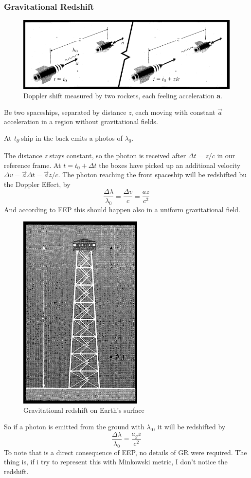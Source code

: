 \subsubsection{Gravitational Redshift}
\begin{figure}[h]
\centering
\includegraphics[width=0.8\linewidth]{imm/gravshift1.png}
\caption{Doppler shift measured by two rockets, each feeling acceleration \textbf{a}.}
\label{imm:gravshift1.png}
\end{figure}

Be two spaceships, separated by distance \emph{z}, each moving with constant $\vec{a}$ acceleration in a region without gravitational fields. \par
At \emph{t\textsubscript{0}} ship in the back emits a photos of $\lambda_{0}$.\par
The distance \emph{z} stays constant, so the photon is received after $\Delta t = z/c$ in our reference frame. At $t = t_{0}+ \Delta t$ the boxes have picked up an additional velocity $\Delta v = \vec{a}\Delta t = \vec{a}z/c$. The photon reaching the front spaceship will be redshifted bu the Doppler Effect, by \[
\frac{\Delta \lambda }{\lambda_{0}} = \frac{\Delta v}{c} = \frac{a z}{c^{2}}
\]
And according to EEP this should happen also in a uniform gravitational field.\par
\begin{figure}[h]
\centering
\includegraphics[width=0.3\linewidth]{imm/gravshift2.png}
\caption{Gravitational redshift on Earth's surface}
\label{imm:gravshift2}
\end{figure}
So if a photon is emitted from the ground with $\lambda_{0}$, it will be redshifted by
\[
\frac{\Delta  \lambda }{\lambda_{0}} = \frac{a_{g}z}{c^{2}}
\]
To note that is a direct consequence of EEP, no details of GR were required.
The thing is, if i try to represent this with Minkowski metric, I don't notice the redshift.

